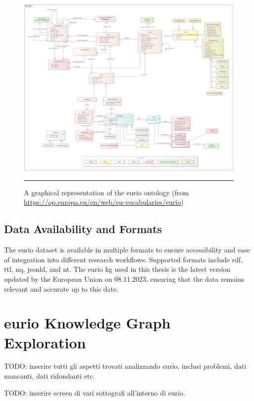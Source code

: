 \begin{figure}[htbp]
    \centering
 \includegraphics[width=\textwidth]{figures/data-analysis/EURIO_V2.4.png}
     \rule{35em}{0.5pt}
    \caption{A graphical representation of the \gls{eurio} ontology (from \url{https://op.europa.eu/en/web/eu-vocabularies/eurio})}
 \label{fig:eurio-ontology}
\end{figure}

\subsection*{Data Availability and Formats}

The \gls{eurio} dataset is available in multiple formats to ensure accessibility and ease of integration into different research workflows.
Supported formats include \gls{rdf}, \gls{ttl}, \gls{nq}, \gls{jsonld}, and \gls{nt}.
The \gls{eurio} \gls{kg} used in this thesis is the latest version updated by the European Union on 08.11.2023, ensuring that the data remains relevant and accurate up to this date.

\section{\gls{eurio} Knowledge Graph Exploration}

TODO: inserire tutti gli aspetti trovati analizzando eurio, inclusi problemi, dati mancanti, dati ridondanti etc.

TODO: inserire screen di vari sottografi all'interno di eurio.


